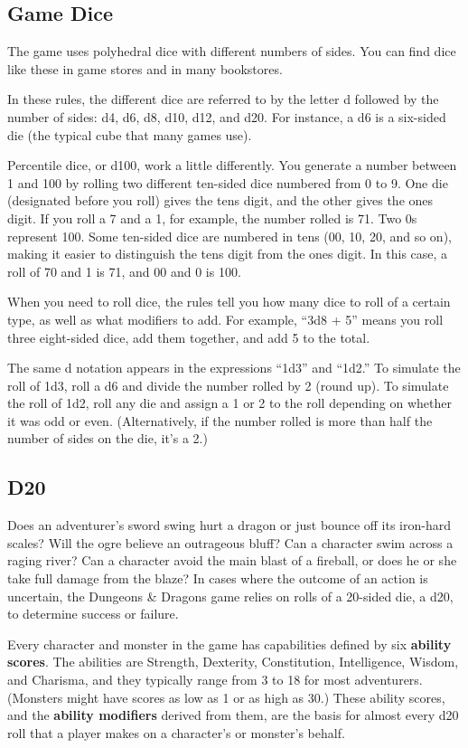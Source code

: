 \subsection{Game Dice}
The game uses polyhedral dice with different numbers of sides. You can find dice like these in game stores and in many bookstores.

In these rules, the different dice are referred to by the letter d followed by the number of sides: d4, d6, d8, d10, d12, and d20. For instance, a d6 is a six-sided die (the typical cube that many games use).

Percentile dice, or d100, work a little differently. You generate a number between 1 and 100 by rolling two different ten-sided dice numbered from 0 to 9. One die (designated before you roll) gives the tens digit, and the other gives the ones digit. If you roll a 7 and a 1, for example, the number rolled is 71. Two 0s represent 100. Some ten-sided dice are numbered in tens (00, 10, 20, and so on), making it easier to distinguish the tens digit from the ones digit. In this case, a roll of 70 and 1 is 71, and 00 and 0 is 100.

When you need to roll dice, the rules tell you how many dice to roll of a certain type, as well as what modifiers to add. For example, “3d8 + 5” means you roll three eight-sided dice, add them together, and add 5 to the total.

The same d notation appears in the expressions “1d3” and “1d2.” To simulate the roll of 1d3, roll a d6 and divide the number rolled by 2 (round up). To simulate the roll of 1d2, roll any die and assign a 1 or 2 to the roll depending on whether it was odd or even. (Alternatively, if the number rolled is more than half the number of sides on the die, it’s a 2.)

\subsection{D20}
Does an adventurer’s sword swing hurt a dragon or just bounce off its iron-hard scales? Will the ogre believe an outrageous bluff? Can a character swim across a raging river? Can a character avoid the main blast of a fireball, or does he or she take full damage from the blaze? In cases where the outcome of an action is uncertain, the Dungeons \& Dragons game relies on rolls of a 20-sided die, a d20, to determine success or failure.

Every character and monster in the game has capabilities defined by six \textbf{ability scores}. The abilities are Strength, Dexterity, Constitution, Intelligence, Wisdom, and Charisma, and they typically range from 3 to 18 for most adventurers. (Monsters might have scores as low as 1 or as high as 30.) These ability scores, and the \textbf{ability modifiers} derived from them, are the basis for almost every d20 roll that a player makes on a character’s or monster’s behalf.

